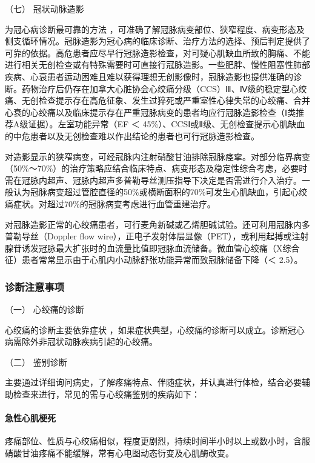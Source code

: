 \hypertarget{text00309.htmlux5cux23CHP10-7-2-2-7}{}
（七） 冠状动脉造影

为冠心病诊断最可靠的方法
，可准确了解冠脉病变部位、狭窄程度、病变形态及侧支循环情况。冠脉造影为冠心病的临床诊断、治疗方法的选择、预后判定提供了可靠的依据。高危患者应尽早行冠脉造影检查，对可疑心肌缺血所致的胸痛、不能进行相关无创检查或有特殊需要时可直接行冠脉造影。一些肥胖、慢性阻塞性肺部疾病、心衰患者运动困难且难以获得理想无创影像时，冠脉造影也提供准确的诊断。药物治疗后仍存在加拿大心脏协会心绞痛分级（CCS）Ⅲ、Ⅳ级的稳定型心绞痛、无创检查提示存在高危征象、发生过猝死或严重室性心律失常的心绞痛、合并心衰的心绞痛以及临床提示存在严重冠脉病变的患者均应行冠脉造影检查（Ⅰ类推荐A级证据）。左室功能异常（EF
＜
45\%）、CCSⅠ或Ⅱ级、无创检查提示心肌缺血的中危患者以及无创检查难以作出结论的患者也可行冠脉造影检查。

对造影显示的狭窄病变，可经冠脉内注射硝酸甘油排除冠脉痉挛。对部分临界病变（50\%～70\%）的治疗策略应结合临床特点、病变形态及稳定性综合考虑，必要时需在冠脉内超声、冠脉内超声多普勒导丝测压指导下决定是否需进行介入治疗。一般认为冠脉病变超过管腔直径的50\%或横断面积的70\%可发生心肌缺血，引起心绞痛症状。对超过70\%的冠脉病变考虑进行血管重建治疗。

对冠脉造影正常的心绞痛患者，可行麦角新碱或乙烯胆碱试验。还可利用冠脉内多普勒导丝（Doppler
flow
wire），正电子发射体层显像（PET），或利用起搏或注射腺苷诱发冠脉最大扩张时的血流量比值即冠脉血流储备。微血管心绞痛（X综合征）患者常常显示由于心肌内小动脉舒张功能异常而致冠脉储备下降（＜
2.5）。

\subsubsection{诊断注意事项}

\hypertarget{text00309.htmlux5cux23CHP10-7-2-3-1}{}
（一） 心绞痛的诊断

心绞痛的诊断主要依靠症状
，如果症状典型，心绞痛的诊断可以成立。诊断冠心病需除外非冠状动脉疾病引起的心绞痛。

\hypertarget{text00309.htmlux5cux23CHP10-7-2-3-2}{}
（二） 鉴别诊断

主要通过详细询问病史，了解疼痛特点、伴随症状，并认真进行体检，结合必要辅助检查来进行，常见的需与心绞痛鉴别的疾病如下：

\paragraph{急性心肌梗死}

疼痛部位、性质与心绞痛相似，程度更剧烈，持续时间半小时以上或数小时，含服硝酸甘油疼痛不能缓解，常有心电图动态衍变及心肌酶改变。

